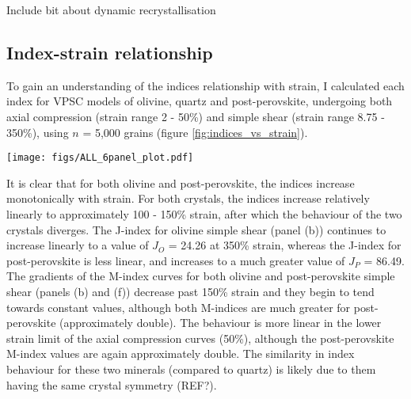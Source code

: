 \documentclass[a4paper,12pt]{report}
\numberwithin{equation}{chapter}
\begin{document}
Include bit about dynamic recrystallisation

\subsection{Index-strain relationship}

To gain an understanding of the indices relationship with strain, I calculated each index for VPSC models of olivine, quartz and post-perovskite, undergoing both axial compression (strain range 2 - 50\%) and simple shear (strain range 8.75 - 350\%), using $n$ = 5,000 grains (figure \ref{fig:indices_vs_strain}).     

\begin{figure*}[p]
  \centering
    \texttt{[image: figs/ALL\_6panel\_plot.pdf]}
  \caption[Relation of indices to strain (VPSC)]{Relationship between the J-index, continuous M-index and discrete M-index to sample strain. Data are from VPSC models, with the indices calculated using the same 5,000 grains at each strain step (this many grains ensures the results are in the convergent regime). Discrete M-index calculated with a bin size of 0.25$^\circ$. \textbf{Top row} shows data for olivine, \textbf{middle row} shows quartz and \textbf{bottom row} shows post-perovskite (P-PS). \textbf{Left column} shows data from an axial compression VPSC model, the \textbf{right column} shows data from a simple shear VPSC model. Note the change of scale on both y-axes in \textbf{f}. Applying these scales to other plots reduces clarity --- consistent scales on all other plots (within each column) allows for useful comparison (see text).}
  \label{fig:indices_vs_strain}
\end{figure*} 

It is clear that for both olivine and post-perovskite, the indices increase monotonically with strain. For both crystals, the indices increase relatively linearly to approximately 100 - 150\% strain, after which the behaviour of the two crystals diverges. The J-index for olivine simple shear (panel (b)) continues to increase linearly to a value of $J_O$ = 24.26 at 350\% strain, whereas the J-index for post-perovskite is less linear, and increases to a much greater value of $J_P$ = 86.49. The gradients of the M-index curves for both olivine and post-perovskite simple shear (panels (b) and (f)) decrease past 150\% strain and they begin to tend towards constant values, although both M-indices are much greater for post-perovskite (approximately double). The behaviour is more linear in the lower strain limit of the axial compression curves (50\%), although the post-perovskite M-index values are again approximately double. The similarity in index behaviour for these two minerals (compared to quartz) is likely due to them having the same crystal symmetry (REF?).
\end{document}
